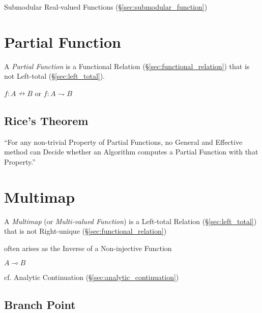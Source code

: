 \fist Submodular Real-valued Functions (\S\ref{sec:submodular_function})



\section{Partial Function}\label{sec:partial_function}

A \emph{Partial Function} is a Functional Relation
(\S\ref{sec:functional_relation}) that is not Left-total
(\S\ref{sec:left_total}).

$f : A \nrightarrow B$ or $f : A \rightharpoondown B$




\subsection{Rice's Theorem}\label{sec:rices_theorem}

``For any non-trivial Property of Partial Functions, no General and
Effective method can Decide whether an Algorithm computes a Partial
Function with that Property.''



\section{Multimap}\label{sec:multimap}

A \emph{Multimap} (or \emph{Multi-valued Function}) is a Left-total
Relation (\S\ref{sec:left_total}) that is not Right-unique
(\S\ref{sec:functional_relation})

often arises as the Inverse of a Non-injective Function

$A \multimap B$

cf. Analytic Continuation (\S\ref{sec:analytic_continuation})



\subsection{Branch Point}\label{sec:branch_point}

